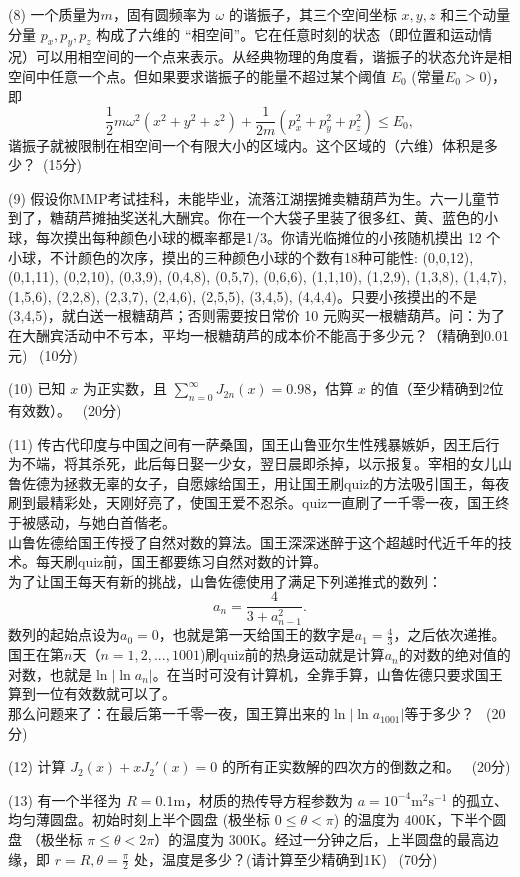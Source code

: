\documentclass[12pt,CJK]{article}
\def\mark#1{{\ \color{blue}(#1分)}}
\begin{document}
\item[(8)]{一个质量为$m$，固有圆频率为 $\omega$ 的谐振子，其三个空间坐标 $x,y,z$ 和三个动量分量 $p_x, p_y, p_z$ 构成了六维的 ``相空间''。它在任意时刻的状态（即位置和运动情况）可以用相空间的一个点来表示。从经典物理的角度看，谐振子的状态允许是相空间中任意一个点。但如果要求谐振子的能量不超过某个阈值 $E_0$ (常量$E_0>0$)，即
    $$\frac{1}{2}m\omega^2 \left(x^2+y^2+z^2\right) + \frac{1}{2m}\left(p_x^2+p_y^2+p_z^2\right) \le E_0,$$      
    谐振子就被限制在相空间一个有限大小的区域内。这个区域的（六维）体积是多少？\mark{15}}
\item[(9)]{假设你MMP考试挂科，未能毕业，流落江湖摆摊卖糖葫芦为生。六一儿童节到了，糖葫芦摊抽奖送礼大酬宾。你在一个大袋子里装了很多红、黄、蓝色的小球，每次摸出每种颜色小球的概率都是1/3。你请光临摊位的小孩随机摸出 12 个小球，不计颜色的次序，摸出的三种颜色小球的个数有18种可能性: (0,0,12), (0,1,11), (0,2,10), (0,3,9), (0,4,8), (0,5,7), (0,6,6), (1,1,10), (1,2,9), (1,3,8), (1,4,7), (1,5,6), (2,2,8), (2,3,7), (2,4,6), (2,5,5), (3,4,5), (4,4,4)。只要小孩摸出的不是 (3,4,5)，就白送一根糖葫芦；否则需要按日常价 10 元购买一根糖葫芦。问：为了在大酬宾活动中不亏本，平均一根糖葫芦的成本价不能高于多少元？（精确到0.01元) \mark{10}}
\item[(10)]{已知 $x$ 为正实数，且 $\sum_{n=0}^\infty J_{2n}(x) = 0.98$，估算 $x$ 的值（至少精确到2位有效数）。 \mark{20}}
\item[(11)]{传古代印度与中国之间有一萨桑国，国王山鲁亚尔生性残暴嫉妒，因王后行为不端，将其杀死，此后每日娶一少女，翌日晨即杀掉，以示报复。宰相的女儿山鲁佐德为拯救无辜的女子，自愿嫁给国王，用让国王刷quiz的方法吸引国王，每夜刷到最精彩处，天刚好亮了，使国王爱不忍杀。quiz一直刷了一千零一夜，国王终于被感动，与她白首偕老。 \\
山鲁佐德给国王传授了自然对数的算法。国王深深迷醉于这个超越时代近千年的技术。每天刷quiz前，国王都要练习自然对数的计算。\\
为了让国王每天有新的挑战，山鲁佐德使用了满足下列递推式的数列：
$$a_n = \frac{4}{3+a_{n-1}^2}.$$
数列的起始点设为$a_0=0$，也就是第一天给国王的数字是$a_1=\frac{4}{3}$，之后依次递推。\\
国王在第$n$天（$n=1,2,...,1001$)刷quiz前的热身运动就是计算$a_n$的对数的绝对值的对数，也就是$\ln|\ln a_n|$。在当时可没有计算机，全靠手算，山鲁佐德只要求国王算到一位有效数就可以了。\\
那么问题来了：在最后第一千零一夜，国王算出来的$\ln|\ln a_{1001}|$等于多少？ \mark{20} }
\item[(12)]{计算 $J_2(x)+ xJ_2'(x)=0$ 的所有正实数解的四次方的倒数之和。 \mark{20} }
\item[(13)]{有一个半径为 $R=0.1\mathrm{m}$，材质的热传导方程参数为 $a=10^{-4}\mathrm{m^2s^{-1}}$ 的孤立、均匀薄圆盘。初始时刻上半个圆盘 (极坐标 $0\le \theta < \pi$) 的温度为 $400\mathrm{K}$，下半个圆盘 （极坐标 $\pi \le\theta < 2\pi$）的温度为 $300\mathrm{K}$。经过一分钟之后，上半圆盘的最高边缘，即 $r=R, \theta=\frac{\pi}{2}$ 处，温度是多少？(请计算至少精确到$1\mathrm{K}$) \mark{70}}  
  \eitem

  
  
\ech
\end{document}
